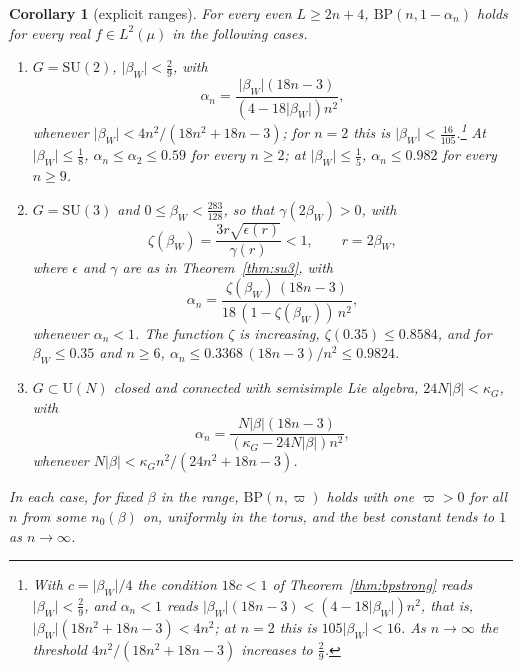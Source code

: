\documentclass[aps,prd,twocolumn,superscriptaddress,nofootinbib,longbibliography,floatfix,amsmath,amssymb,10pt]{revtex4-2}
\newtheorem{corollary}[theorem]{Corollary}
\theoremstyle{definition}
\theoremstyle{remark}
\newcommand{\SU}{\mathrm{SU}}
\newcommand{\U}{\mathrm{U}}
\begin{document}
\begin{corollary}[explicit ranges]\label{cor:bpranges}
For every even $L\ge2n+4$, $\mathrm{BP}(n,1-\alpha_n)$ holds for every real
$f\in L^2(\mu)$ in the following cases.
\begin{enumerate}[label=\textup{(\roman*)},leftmargin=*]
\item $G=\SU(2)$, $\lvert\beta_W\rvert<\frac29$, with
\[
\alpha_n=\frac{\lvert\beta_W\rvert(18n-3)}{(4-18\lvert\beta_W\rvert)n^2},
\]
whenever $\lvert\beta_W\rvert<4n^2/(18n^2+18n-3)$; for $n=2$ this is
$\lvert\beta_W\rvert<\frac{16}{105}$.\footnote{With $c=\lvert\beta_W
\rvert/4$ the condition $18c<1$ of Theorem~\ref{thm:bpstrong} reads
$\lvert\beta_W\rvert<\frac29$, and $\alpha_n<1$ reads $\lvert\beta_W\rvert
(18n-3)<(4-18\lvert\beta_W\rvert)n^2$, that is, $\lvert\beta_W\rvert(18n^2+
18n-3)<4n^2$; at $n=2$ this is $105\lvert\beta_W\rvert<16$. As $n\to
\infty$ the threshold $4n^2/(18n^2+18n-3)$ increases to $\frac29$.} At $\lvert\beta_W\rvert\le\frac18$,
$\alpha_n\le\alpha_2\le0.59$ for every $n\ge2$; at $\lvert\beta_W\rvert\le
\frac15$, $\alpha_n\le0.982$ for every $n\ge9$.
\item $G=\SU(3)$ and $0\le\beta_W<\frac{283}{128}$, so that $\gamma(2\beta_W)>0$, with
\[
\zeta(\beta_W)=\frac{3r\sqrt{\epsilon(r)}}{\gamma(r)}<1,\qquad r=2\beta_W,
\]
where $\epsilon$ and $\gamma$ are as in Theorem~\ref{thm:su3}, with
\[
\alpha_n=\frac{\zeta(\beta_W)\,(18n-3)}{18\,(1-\zeta(\beta_W))\,n^2},
\]
whenever $\alpha_n<1$. The function $\zeta$ is increasing, $\zeta(0.35)\le0.8584$, and for
$\beta_W\le0.35$ and $n\ge6$, $\alpha_n\le0.3368\,(18n-3)/n^2\le0.9824$.
\item $G\subset\U(N)$ closed and connected with semisimple Lie algebra,
$24N\lvert\beta\rvert<\kappa_G$, with
\[
\alpha_n=\frac{N\lvert\beta\rvert(18n-3)}{(\kappa_G-24N\lvert\beta\rvert)
n^2},
\]
whenever $N\lvert\beta\rvert<\kappa_Gn^2/(24n^2+18n-3)$.
\end{enumerate}
In each case, for fixed $\beta$ in the range, $\mathrm{BP}(n,\varpi)$ holds
with one $\varpi>0$ for all $n$ from some $n_0(\beta)$ on, uniformly in the
torus, and the best constant tends to $1$ as $n\to\infty$.
\end{corollary}
\end{document}
